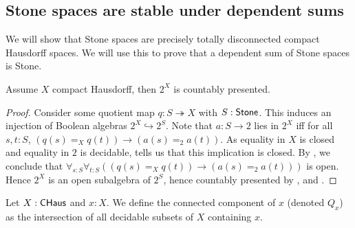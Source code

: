 \subsection{Stone spaces are stable under dependent sums}
We will show that Stone spaces are precisely totally disconnected compact Hausdorff spaces. 
We will use this to prove that a dependent sum of Stone spaces is Stone.

\begin{lemma}\label{AlgebraCompactHausdorffCountablyPresented}
Assume $X$ compact Hausdorff, then $2^X$ is countably presented.
\end{lemma}

\begin{proof}
  Consider some quotient map $q:S\twoheadrightarrow X$ with $S:\mathsf{Stone}$. 
%
  This induces an injection of Boolean algebras $2^X \hookrightarrow 2^S$.
  Note that $a:S\to 2$ lies in $2^X$ iff for all $s,t:S$, 
  $(q(s) =_X q(t)) \to (a(s) =_2a(t))$. 
  As equality in $X$ is closed and equality in $2$ is decidable, 
  tells us that this implication is closed. 
  By , we conclude that 
  $\forall_{s:S} \forall_{t:S} ((q(s) =_X q(t)) \to (a(s) =_2 a(t)))$ is open. 
  Hence $2^X$ is an open subalgebra of $2^S$, 
  hence countably presented by 
  ,  and .
%
%
%
\end{proof}
\begin{definition}
  Let $X:\mathsf{CHaus}$ and $x:X$. 
  We define the connected component of $x$ (denoted $Q_x$)
  as the intersection of all decidable subsets of $X$ containing $x$. 
\end{definition}

